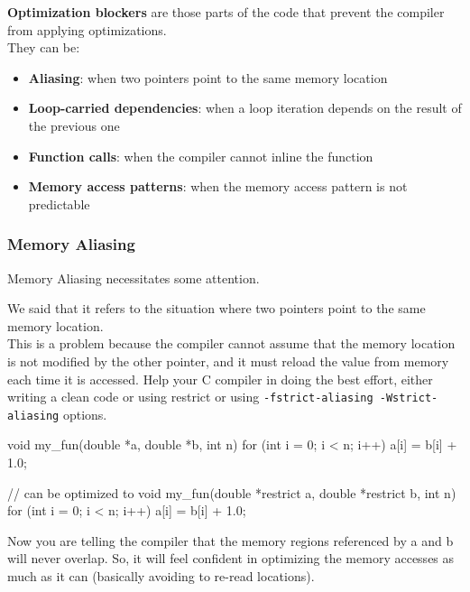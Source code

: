 \begin{observationblock}
    \textbf{Optimization blockers} are those parts of the code that prevent the compiler from applying optimizations.\\
    They can be:
    \begin{itemize}
        \item \textbf{Aliasing}: when two pointers point to the same memory location
        \item \textbf{Loop-carried dependencies}: when a loop iteration depends on the result of the previous one
        \item \textbf{Function calls}: when the compiler cannot inline the function
        \item \textbf{Memory access patterns}: when the memory access pattern is not predictable
    \end{itemize}
\end{observationblock}

\subsubsection*{Memory Aliasing}

Memory Aliasing necessitates some attention.

We said that it refers to the situation where two pointers point to the same memory location.\\
This is a problem because the compiler cannot assume that the memory location is not modified by the other pointer, and it must reload the value from memory each time it is accessed.
Help your C compiler in doing the best effort, either writing a clean code or using restrict or using \texttt{-fstrict-aliasing -Wstrict-aliasing} options.

\begin{exampleblock}
    \begin{codeblock}[language=C++]
        void my_fun(double *a, double *b, int n) {
            for (int i = 0; i < n; i++) {
                a[i] = b[i] + 1.0;
            }
        }

        // can be optimized to
        void my_fun(double *restrict a, double *restrict b, int n) {
            for (int i = 0; i < n; i++) {
                a[i] = b[i] + 1.0;
            }
        }
    \end{codeblock}
    Now you are telling the compiler that the memory regions
    referenced by a and b will never overlap.
    So, it will feel confident in optimizing the memory accesses as
    much as it can (basically avoiding to re-read locations).
\end{exampleblock}



